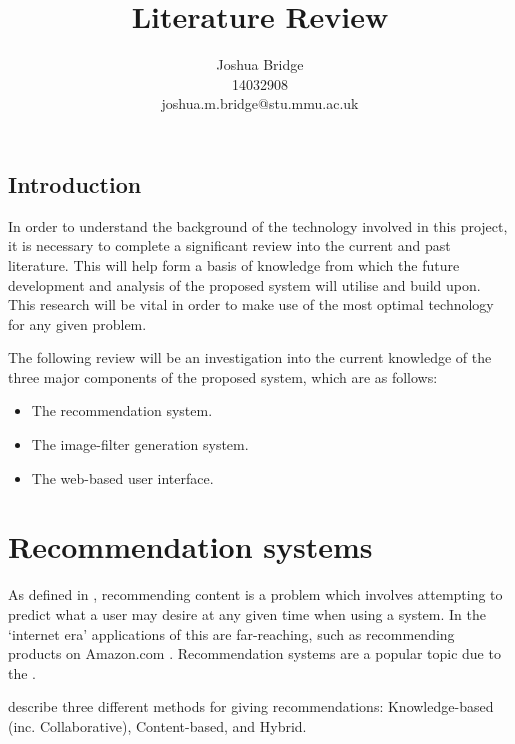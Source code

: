 \documentclass[a4paper,12pt]{article}
\title{Literature Review}
\author{Joshua Bridge \\14032908 \\joshua.m.bridge@stu.mmu.ac.uk}
\begin{document}
\maketitle


\tableofcontents

\listoffigures

\doublespacing

\subsection{Introduction}
  In order to understand the background of the technology involved in this project, it is necessary to complete a significant review into the current and past literature. This will help form a basis of knowledge from which the future development and analysis of the proposed system will utilise and build upon. This research will be vital in order to make use of the most optimal technology for any given problem.

  The following review will be an investigation into the current knowledge of the three major components of the proposed system, which are as follows:

  \begin{itemize}
    \item The recommendation system.
    \item The image-filter generation system.
    \item The web-based user interface.
  \end{itemize}

\section{Recommendation systems}
  As defined in \cite{ricci2011introduction}, recommending content is a problem which involves attempting to predict what a user may desire at any given time when using a system. In the ‘internet era’ applications of this are far-reaching, such as recommending products on Amazon.com \cite{linden2003amazon}. Recommendation systems are a popular topic due to the  \citep{adomavicius2005toward}.

  \cite{jannach2010recommender} describe three different methods for giving recommendations: Knowledge-based (inc. Collaborative), Content-based, and Hybrid.
\end{document}
